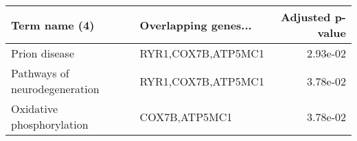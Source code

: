\begin{tabular}{llr}
\toprule
                Term name (4) & Overlapping genes... &  Adjusted p-value \\
\midrule
                Prion disease &   RYR1,COX7B,ATP5MC1 &          2.93e-02 \\
Pathways of neurodegeneration &   RYR1,COX7B,ATP5MC1 &          3.78e-02 \\
    Oxidative phosphorylation &        COX7B,ATP5MC1 &          3.78e-02 \\
\bottomrule
\end{tabular}
